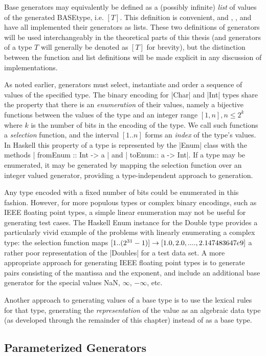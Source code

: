 Base generators may equivalently be defined as 
a (possibly infinite) \emph{list} of values of the generated BASEtype, i.e. $[ T ]$.
This definition is convenient,
and \SC, \FEAT, \EC and \GC have all implemented their generators as lists.
These two definitions of generators will be used interchangeably in 
the theoretical parts of this thesis
(and generators of a type $T$ will generally be denoted as $[ T ]$ for brevity),
but the distinction between the function and list definitions
will be made explicit in any discussion of \pbt implementations.

As noted earlier,
generators must select, instantiate and order a sequence of values of the specified type.
The binary encoding for |Char| and |Int| types share the property
that there is an \emph{enumeration} of their values,
namely a bijective functions between the values of the type
and an integer range $[1,n], n \le 2^k$ where $k$ is the number of bits in the encoding of the type.
We call such functions a \emph{selection} function,
and the interval $[1..n]$ forms an \emph{index} of the type's values.
In Haskell this property of a type is represented by the |Enum| class
with the methods | fromEnum :: Int -> a | and | toEnum:: a -> Int|.
If a type may be enumerated,
it may be generated by mapping the selection function over 
an integer valued generator,
providing a type-independent approach to generation.

Any type encoded with a fixed number of bits
could be enumerated in this fashion.
However, for more populous types or complex binary encodings,
such as IEEE floating point types,
a simple linear enumeration may not be useful for generating test cases.
The Haskell Enum instance for the Double type
provides a particularly vivid example of 
the problems with linearly enumerating a complex type:
the selection function maps $[1 .. (2^{31}-1)] \rightarrow [1.0, 2.0, ...., 2.147483647e9]$ 
a rather poor representation of the |Doubles| for a test data set.
A more appropriate approach for generating IEEE floating point types
is to generate pairs consisting of the mantissa and the exponent,
and include an additional base generator for the special values NaN, $\infty$, $- \infty$, etc.

Another approach to generating values of a base type is
to use the lexical rules for that type,
generating the \emph{representation} of the value
as an algebraic data type (as developed through the remainder of this chapter)
instead of as a base type.

\subsection{Parameterized Generators}

